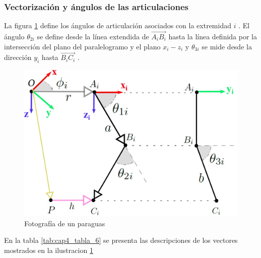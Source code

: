     \newpage

        \subsubsection{Vectorización y ángulos de las articulaciones} \label{cap4_angulosinteriores}
        
        La figura \ref{f:Cap4_Metodo_A_Modelacion_Cinematica_Posicion_8} define los ángulos de articulación asociados con la extremidad  \( i \) . El ángulo \(  \theta _{2i} \)  se define desde la línea extendida de  \( \overrightarrow{A_{i}B_{i}} \)  hasta la línea definida por la intersección del plano del paralelogramo y el plano  \( x_{i}-z_{i} \)  y  \(  \theta _{3i} \)  se mide desde la dirección  \( y_{i} \)  hasta  \( \overrightarrow{B_{i}C_{i}} \) .
        
        \begin{figure}[htb]
             \centering
             \includegraphics[width=1.0\linewidth]{Main/Chapter4/Images4/DIBUJO21.jpg}
              \caption{Fotografía de un paraguas}
              \label{f:Cap4_Metodo_A_Modelacion_Cinematica_Posicion_8}
        \end{figure}
        
        
        En la tabla \ref{tab:cap4_tabla_6} se presenta las descripciones de los vectores mostrados en la ilustracion  \ref{f:Cap4_Metodo_A_Modelacion_Cinematica_Posicion_8}
        
